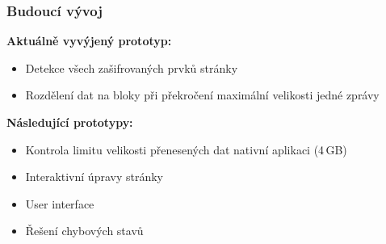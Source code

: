 \documentclass[10pt,xcolor=pdflatex]{beamer}
\begin{document}
\begin{frame}
    \frametitle{Budoucí vývoj}
    \textbf{Aktuálně vyvýjený prototyp:}
    \begin{itemize}
        \item Detekce všech zašifrovaných prvků stránky
        \item Rozdělení dat na bloky při překročení maximální velikosti jedné zprávy
    \end{itemize}
    \medskip
    \textbf{Následující prototypy:}
    \begin{itemize}
        \item Kontrola limitu velikosti přenesených dat nativní aplikaci (4\,GB)
        \item Interaktivní úpravy stránky
        \item User interface
        \item Řešení chybových stavů
    \end{itemize}
\end{frame}


\appendix
\addtocounter{framenumber}{-\value{framenumber}} %
\end{document}
